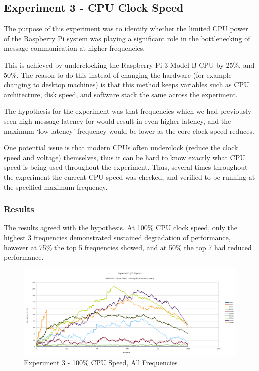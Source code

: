\documentclass[../dissertation.tex]{subfiles}
\begin{document}
\subsection{Experiment 3 - CPU Clock Speed}

The purpose of this experiment was to identify whether the limited CPU power of the Raspberry Pi system was playing a significant role in the bottlenecking of message communication at higher frequencies.

This is achieved by underclocking the Raspberry Pi 3 Model B CPU by 25\%, and 50\%. The reason to do this instead of changing the hardware (for example changing to desktop machines) is that this method keeps variables such as CPU architecture, disk speed, and software stack the same across the experiment.

The hypothesis for the experiment was that frequencies which we had previously seen high message latency for would result in even higher latency, and the maximum `low latency' frequency would be lower as the core clock speed reduces.

One potential issue is that modern CPUs often underclock (reduce the clock speed and voltage) themselves, thus it can be hard to know exactly what CPU speed is being used throughout the experiment. Thus, several times throughout the experiment the current CPU speed was checked, and verified to be running at the specified maximum frequency.

\subsubsection{Results}

The results agreed with the hypothesis. At 100\% CPU clock speed, only the highest 3 frequencies demonstrated sustained degradation of performance, however at 75\% the top 5 frequencies showed, and at 50\% the top 7 had reduced performance.

\begin{figure}[h]
\centering
\includegraphics[width=\textwidth]{images/experiment3/50_clockspeed_mean_values_by_freq_pretty.png}
\caption{Experiment 3 - 100\% CPU Speed, All Frequencies}
\label{exp3-cpu100}
\end{figure}
\end{document}
